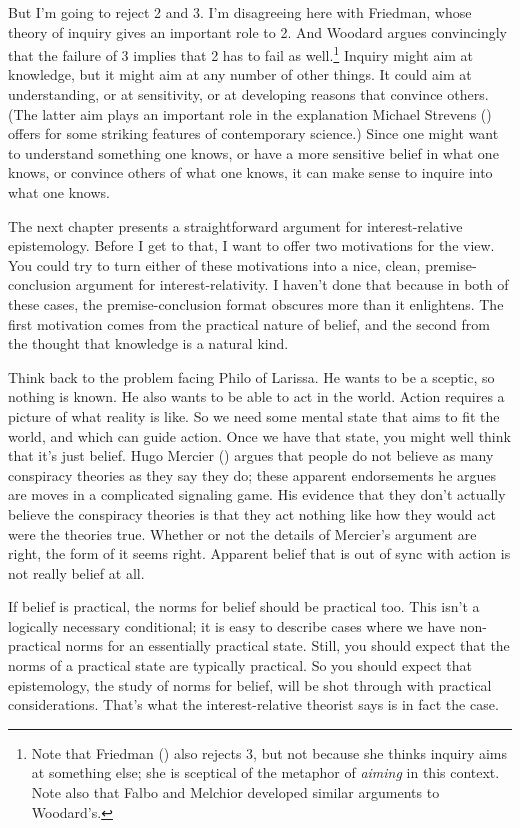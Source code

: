 \documentclass[
  10pt,
  letterpaper,
  twoside]{scrbook}
\begin{document}
But I'm going to reject 2 and 3. I'm disagreeing here with Friedman,
whose theory of inquiry gives an important role to 2. And Woodard argues
convincingly that the failure of 3 implies that 2 has to fail as
well.\footnote{Note that Friedman ()
  also rejects 3, but not because she thinks inquiry aims at something
  else; she is sceptical of the metaphor of \emph{aiming} in this
  context. Note also that Falbo and Melchior developed similar arguments
  to Woodard's.} Inquiry might aim at knowledge, but it might aim at any
number of other things. It could aim at understanding, or at
sensitivity, or at developing reasons that convince others. (The latter
aim plays an important role in the explanation Michael Strevens
() offers for some striking features of
contemporary science.) Since one might want to understand something one
knows, or have a more sensitive belief in what one knows, or convince
others of what one knows, it can make sense to inquire into what one
knows.

The next chapter presents a straightforward argument for
interest-relative epistemology. Before I get to that, I want to offer
two motivations for the view. You could try to turn either of these
motivations into a nice, clean, premise-conclusion argument for
interest-relativity. I haven't done that because in both of these cases,
the premise-conclusion format obscures more than it enlightens. The
first motivation comes from the practical nature of belief, and the
second from the thought that knowledge is a natural kind.

Think back to the problem facing Philo of Larissa. He wants to be a
sceptic, so nothing is known. He also wants to be able to act in the
world. Action requires a picture of what reality is like. So we need
some mental state that aims to fit the world, and which can guide
action. Once we have that state, you might well think that it's just
belief. Hugo Mercier () argues that
people do not believe as many conspiracy theories as they say they do;
these apparent endorsements he argues are moves in a complicated
signaling game. His evidence that they don't actually believe the
conspiracy theories is that they act nothing like how they would act
were the theories true. Whether or not the details of Mercier's argument
are right, the form of it seems right. Apparent belief that is out of
sync with action is not really belief at all.

If belief is practical, the norms for belief should be practical too.
This isn't a logically necessary conditional; it is easy to describe
cases where we have non-practical norms for an essentially practical
state. Still, you should expect that the norms of a practical state are
typically practical. So you should expect that epistemology, the study
of norms for belief, will be shot through with practical considerations.
That's what the interest-relative theorist says is in fact the case.
\end{document}
